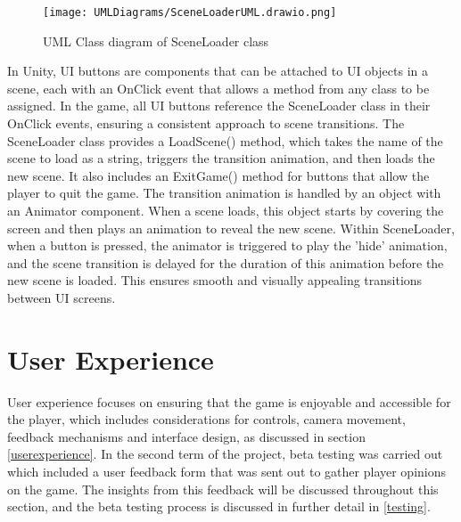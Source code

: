 \documentclass[10pt]{final_report}
\begin{document}
\begin{figure}[H]
    \centering
    \texttt{[image: UMLDiagrams/SceneLoaderUML.drawio.png]}
    \caption{UML Class diagram of SceneLoader class}
    \label{fig:label_SceneLoader}
\end{figure}

In Unity, UI buttons are components that can be attached to UI objects in a scene, each with an OnClick event that allows a method from any class to be assigned. In the game, all UI buttons reference the SceneLoader class in their OnClick events, ensuring a consistent approach to scene transitions. The SceneLoader class provides a LoadScene() method, which takes the name of the scene to load as a string, triggers the transition animation, and then loads the new scene. It also includes an ExitGame() method for buttons that allow the player to quit the game. The transition animation is handled by an object with an Animator component. When a scene loads, this object starts by covering the screen and then plays an animation to reveal the new scene. Within SceneLoader, when a button is pressed, the animator is triggered to play the 'hide' animation, and the scene transition is delayed for the duration of this animation before the new scene is loaded. This ensures smooth and visually appealing transitions between UI screens.

\section{User Experience}\label{UX}
User experience focuses on ensuring that the game is enjoyable and accessible for the player, which includes considerations for controls, camera movement, feedback mechanisms and interface design, as discussed in section \ref{userexperience}. In the second term of the project, beta testing was carried out which included a user feedback form that was sent out to gather player opinions on the game. The insights from this feedback will be discussed throughout this section, and the beta testing process is discussed in further detail in \ref{testing}.
\end{document}
